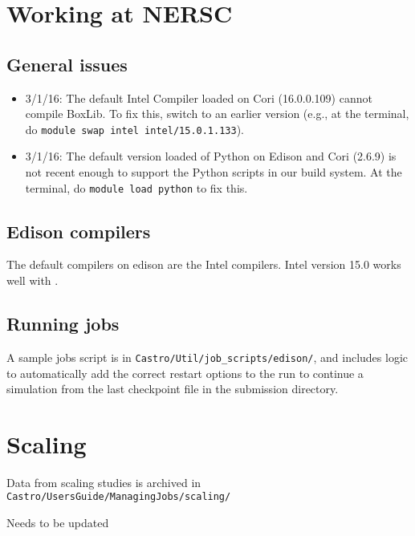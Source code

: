 \section{Working at NERSC}

\subsection{General issues}

\begin{itemize}
  
\item 3/1/16: The default Intel Compiler loaded on Cori (16.0.0.109)
  cannot compile BoxLib. To fix this, switch to an earlier version
  (e.g., at the terminal, do {\tt module swap intel
    intel/15.0.1.133}).

\item 3/1/16: The default version loaded of Python on Edison and Cori
  (2.6.9) is not recent enough to support the Python scripts in our
  build system. At the terminal, do {\tt module load python} to fix
  this.

\end{itemize}

\subsection{Edison compilers}

The default compilers on edison are the Intel compilers.  Intel version 15.0
works well with \castro.

\subsection{Running jobs}

A sample jobs script is in {\tt Castro/Util/job\_scripts/edison/}, and 
includes logic to automatically add the correct restart options to the 
run to continue a simulation from the last checkpoint file in the 
submission directory.



\section{Scaling}

Data from scaling studies is archived in {\tt Castro/UsersGuide/ManagingJobs/scaling/}

Needs to be updated



